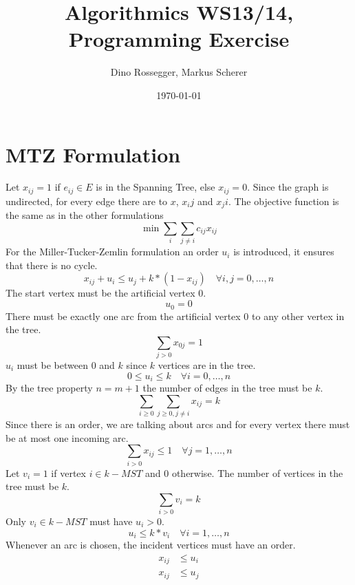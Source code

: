 \documentclass[a4paper]{article}
\title{Algorithmics WS13/14, Programming Exercise}
\author{Dino Rossegger, Markus Scherer}
\date{\today}
\begin{document}
\maketitle
\section{MTZ Formulation}
Let $x_{ij}=1$ if $e_{ij}\in E$ is in the Spanning Tree, else $x_{ij}=0$. Since the graph is undirected, for every edge there are to $x$, $x_ij$ and $x_ji$. The objective function is the same as in the other formulations
\begin{equation}
	\min{\sum_i \sum_{j\not=i} c_{ij}x_{ij}}
\end{equation}
For the Miller-Tucker-Zemlin formulation an order $u_i$ is introduced, it ensures that there is no cycle.
\begin{equation}
x_{ij} + u_i \leq u_j + k*(1-x_{ij}) \quad \forall i,j=0,\dots,n
\end{equation}
The start vertex must be the artificial vertex $0$.
\begin{equation}
	u_0=0
\end{equation}
There must be exactly one arc from the artificial vertex $0$ to any other vertex in the tree.
\begin{equation}
	\sum_{j>0} x_{0j} = 1
\end{equation}
$u_i$ must be between $0$ and $k$ since $k$ vertices are in the tree.
\begin{equation}
0\leq u_i \leq k \quad \forall i=0,\dots,n
\end{equation}
By the tree property $n=m+1$ the number of edges in the tree must be $k$.
\begin{equation}
	\sum_{i\geq0} \sum_{j\geq0,j\not =i} x_{ij} = k
\end{equation}
Since there is an order, we are talking about arcs and for every vertex there must be at most one incoming arc.
\begin{equation}
	\sum_{i>0} x_{ij}\leq 1 \quad \forall j=1,\dots,n
\end{equation}
Let $v_i=1$ if vertex $i \in k-MST$ and $0$ otherwise.
The number of vertices in the tree must be $k$.
\begin{equation}
	\sum_{i>0}v_i=k
\end{equation}
Only $v_i \in k-MST$ must have $u_i>0$.
\begin{equation}
	u_i \leq k*v_i	\quad \forall i=1,\dots,n
\end{equation}
Whenever an arc is chosen, the incident vertices must have an order.
\begin{align}
	x_{ij} &\leq u_i \\
	x_{ij} &\leq u_j 
\end{align}
\end{document}
